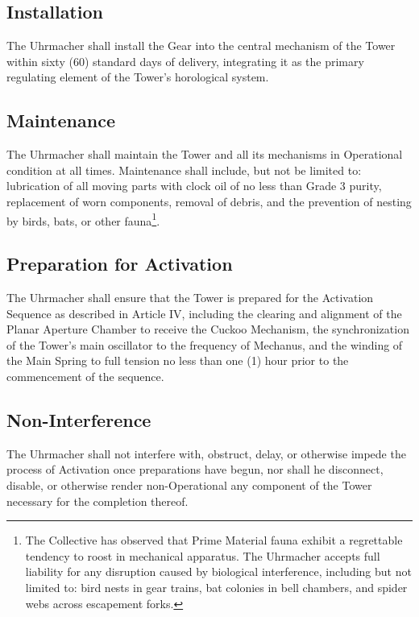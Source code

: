 \documentclass[12pt]{article}
\begin{document}
\subsection{Installation}
The Uhrmacher shall install the Gear into the central mechanism of
the Tower within sixty (60) standard days of delivery, integrating it
as the primary regulating element of the Tower's horological system.

\subsection{Maintenance}
The Uhrmacher shall maintain the Tower and all its mechanisms in
Operational condition at all times. Maintenance shall include, but not
be limited to: lubrication of all moving parts with clock oil of
no less than Grade 3 purity, replacement of worn components, removal
of debris, and the prevention of nesting by birds, bats, or other
fauna\footnote{The Collective has observed that Prime Material fauna
exhibit a regrettable tendency to roost in mechanical apparatus. The
Uhrmacher accepts full liability for any disruption caused by
biological interference, including but not limited to: bird nests in
gear trains, bat colonies in bell chambers, and spider webs across
escapement forks.}.

\subsection{Preparation for Activation}
The Uhrmacher shall ensure that the Tower is prepared for the
Activation Sequence as described in Article IV, including the
clearing and alignment of the Planar Aperture Chamber to receive
the Cuckoo Mechanism, the synchronization of the Tower's main
oscillator to the frequency of Mechanus, and the winding of the
Main Spring to full tension no less than one (1) hour prior to the
commencement of the sequence.

\subsection{Non-Interference}
The Uhrmacher shall not interfere with, obstruct, delay, or otherwise
impede the process of Activation once preparations have begun,
nor shall he disconnect, disable, or otherwise render non-Operational
any component of the Tower necessary for the completion thereof.

\end{document}
